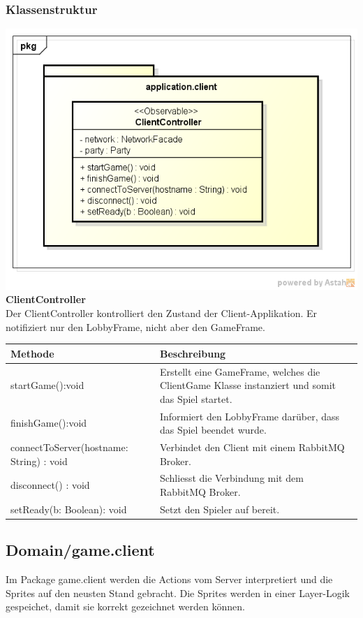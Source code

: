 \documentclass[11pt]{scrartcl}
\begin{document}
\subsubsection{Klassenstruktur}
\includegraphics[scale=0.75]{ClassDiagramApplicationClient}
\newpage
\textbf{ClientController}\\
Der ClientController kontrolliert den Zustand der Client-Applikation. Er notifiziert nur den LobbyFrame, nicht aber den GameFrame.\\
\begin{table}[!h]
\begin{tabularx}{\linewidth}{l X}
\textbf{Methode} & \textbf{Beschreibung}\\
\hline
startGame():void & Erstellt eine GameFrame, welches die ClientGame Klasse instanziert und somit das Spiel startet.\\
finishGame():void & Informiert den LobbyFrame darüber, dass das Spiel beendet wurde.\\
connectToServer(hostname: String) : void & Verbindet den Client mit einem RabbitMQ Broker.\\
disconnect() : void & Schliesst die Verbindung mit dem RabbitMQ Broker.\\
setReady(b: Boolean): void & Setzt den Spieler auf bereit.\\

\end{tabularx}
\end{table}


\newpage
\subsection{Domain/game.client}
Im Package game.client werden die Actions vom Server interpretiert und die Sprites auf den neusten Stand gebracht. Die Sprites werden in einer Layer-Logik gespeichet, damit sie korrekt gezeichnet werden können.
\end{document}

